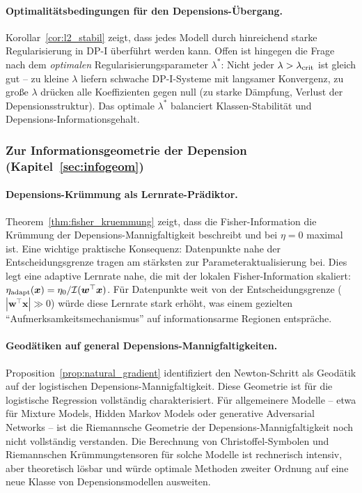 ﻿\documentclass[12pt, a4paper]{article}
\theoremstyle{definition}
\theoremstyle{remark}
\newcommand{\vw}{\bm{w}}
\newcommand{\vx}{\bm{x}}
\newcommand{\T}{\top}
\begin{document}
\paragraph{Optimalitätsbedingungen für den Depensions-Übergang.}
Korollar~\ref{cor:l2_stabil} zeigt, dass jedes Modell durch hinreichend starke
Regularisierung in DP-I überführt werden kann. Offen ist hingegen die Frage nach
dem \emph{optimalen} Regularisierungsparameter $\lambda^*$: Nicht jeder $\lambda >
\lambda_{\rm crit}$ ist gleich gut -- zu kleine $\lambda$ liefern schwache DP-I-Systeme
mit langsamer Konvergenz, zu große $\lambda$ drücken alle Koeffizienten gegen null
(zu starke Dämpfung, Verlust der Depensionsstruktur). Das optimale $\lambda^*$
balanciert Klassen-Stabilität und Depensions-Informationsgehalt.

\subsubsection{Zur Informationsgeometrie der Depension (Kapitel~\ref{sec:infogeom})}

\paragraph{Depensions-Krümmung als Lernrate-Prädiktor.}
Theorem~\ref{thm:fisher_kruemmung} zeigt, dass die Fisher-Information die Krümmung
der Depensions-Mannigfaltigkeit beschreibt und bei $\eta=0$ maximal ist.
Eine wichtige praktische Konsequenz: Datenpunkte nahe der Entscheidungsgrenze tragen
am stärksten zur Parameteraktualisierung bei. Dies legt eine adaptive Lernrate nahe,
die mit der lokalen Fisher-Information skaliert:
$\eta_{\rm adapt}(\vx) = \eta_0 / \mathcal{I}(\vw^\T\vx)$. Für Datenpunkte weit
von der Entscheidungsgrenze ($|\vw^\T\vx| \gg 0$) würde diese Lernrate stark erhöht,
was einem gezielten ``Aufmerksamkeitsmechanismus'' auf informationsarme Regionen
entspräche.

\paragraph{Geodätiken auf general Depensions-Mannigfaltigkeiten.}
Proposition~\ref{prop:natural_gradient} identifiziert den Newton-Schritt als
Geodätik auf der logistischen Depensions-Mannigfaltigkeit. Diese Geometrie ist für
die logistische Regression vollständig charakterisiert. Für allgemeinere Modelle --
etwa für Mixture Models, Hidden Markov Models oder generative Adversarial Networks --
ist die Riemannsche Geometrie der Depensions-Mannigfaltigkeit noch nicht vollständig
verstanden. Die Berechnung von Christoffel-Symbolen und Riemannschen Krümmungstensoren
für solche Modelle ist rechnerisch intensiv, aber theoretisch lösbar und würde
optimale Methoden zweiter Ordnung auf eine neue Klasse von Depensionsmodellen ausweiten.
\end{document}
